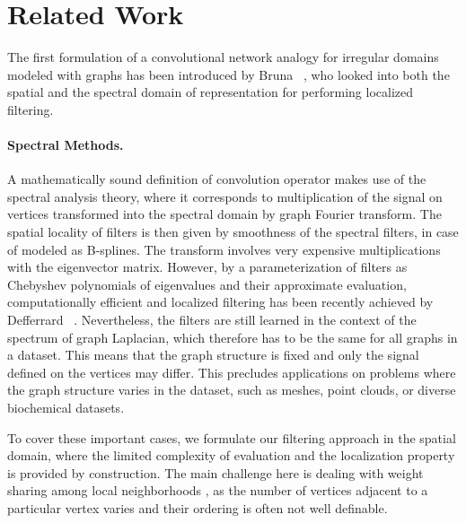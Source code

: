 \documentclass[10pt,twocolumn,letterpaper]{article}
\begin{document}
\section{Related Work}

The first formulation of a convolutional network analogy for irregular domains modeled with graphs has been introduced by Bruna \etal~\cite{bruna13}, who looked into both the spatial and the spectral domain of representation for performing localized filtering. 

\paragraph*{Spectral Methods.} A mathematically sound definition of convolution operator makes use of the spectral analysis theory, where it corresponds to multiplication of the signal on vertices transformed into the spectral domain by graph Fourier transform. The spatial locality of filters is then given by smoothness of the spectral filters, in case of \cite{bruna13} modeled as B-splines. The transform involves very expensive multiplications with the eigenvector matrix. However, by a parameterization of filters as Chebyshev polynomials of eigenvalues and their approximate evaluation, computationally efficient and localized filtering has been recently achieved by Defferrard \etal~\cite{defferrard16}. Nevertheless, the filters are still learned in the context of the spectrum of graph Laplacian, which therefore has to be the same for all graphs in a dataset. This means that the graph structure is fixed and only the signal defined on the vertices may differ. This precludes applications on problems where the graph structure varies in the dataset, such as meshes, point clouds, or diverse biochemical datasets.

To cover these important cases, we formulate our filtering approach in the spatial domain, where the limited complexity of evaluation and the localization property is provided by construction. The main challenge here is dealing with weight sharing among local neighborhoods \cite{bruna13}, as the number of vertices adjacent to a particular vertex varies and their ordering is often not well definable.
\end{document}
